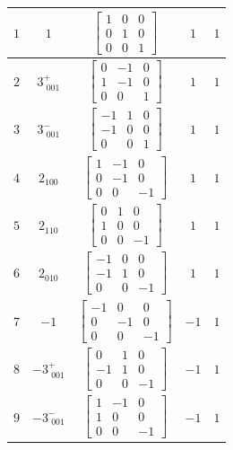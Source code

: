 \documentclass[fleqn,8pt]{jsarticle}
\begin{document}
\begin{longtable}{ccccc}
$ 1 $ & $ 1 $ & $ \begin{bmatrix} 1 & 0 & 0 \\ 0 & 1 & 0 \\ 0 & 0 & 1 \end{bmatrix} $ & $ 1 $ & $ 1 $ \\ \hline
$ 2 $ & $ 3^{+}_{\,\,001} $ & $ \begin{bmatrix} 0 & -1 & 0 \\ 1 & -1 & 0 \\ 0 & 0 & 1 \end{bmatrix} $ & $ 1 $ & $ 1 $ \\ \hline
$ 3 $ & $ 3^{-}_{\,\,001} $ & $ \begin{bmatrix} -1 & 1 & 0 \\ -1 & 0 & 0 \\ 0 & 0 & 1 \end{bmatrix} $ & $ 1 $ & $ 1 $ \\ \hline
$ 4 $ & $ 2{}_{100} $ & $ \begin{bmatrix} 1 & -1 & 0 \\ 0 & -1 & 0 \\ 0 & 0 & -1 \end{bmatrix} $ & $ 1 $ & $ 1 $ \\ \hline
$ 5 $ & $ 2{}_{110} $ & $ \begin{bmatrix} 0 & 1 & 0 \\ 1 & 0 & 0 \\ 0 & 0 & -1 \end{bmatrix} $ & $ 1 $ & $ 1 $ \\ \hline
$ 6 $ & $ 2{}_{010} $ & $ \begin{bmatrix} -1 & 0 & 0 \\ -1 & 1 & 0 \\ 0 & 0 & -1 \end{bmatrix} $ & $ 1 $ & $ 1 $ \\ \hline
$ 7 $ & $ -1 $ & $ \begin{bmatrix} -1 & 0 & 0 \\ 0 & -1 & 0 \\ 0 & 0 & -1 \end{bmatrix} $ & $ -1 $ & $ 1 $ \\ \hline
$ 8 $ & $ -3^{+}_{\,\,001} $ & $ \begin{bmatrix} 0 & 1 & 0 \\ -1 & 1 & 0 \\ 0 & 0 & -1 \end{bmatrix} $ & $ -1 $ & $ 1 $ \\ \hline
$ 9 $ & $ -3^{-}_{\,\,001} $ & $ \begin{bmatrix} 1 & -1 & 0 \\ 1 & 0 & 0 \\ 0 & 0 & -1 \end{bmatrix} $ & $ -1 $ & $ 1 $ \\ \hline

\end{longtable}
\end{document}
